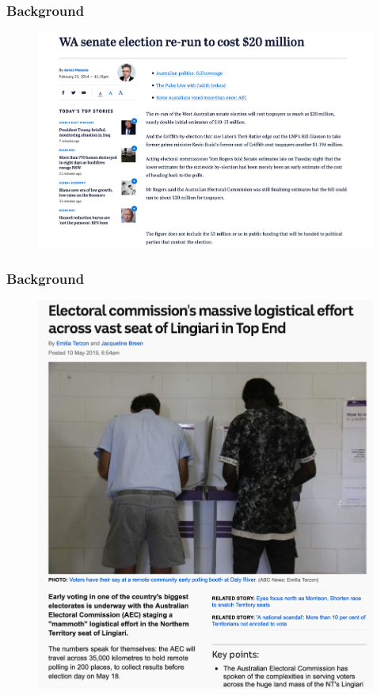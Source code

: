 \documentclass{beamer}
\begin{document}
\begin{frame}
\frametitle{Background}
\begin{figure}
	\begin{center}
	\includegraphics[scale=0.25]{re-election.png}
	\end{center}
  \end{figure} 
\end{frame}


\begin{frame}
\frametitle{Background}
\begin{figure}
	\begin{center}
	\includegraphics[scale=0.25]{logistic.png}
	\end{center}
  \end{figure} 
\end{frame}
\end{document}
